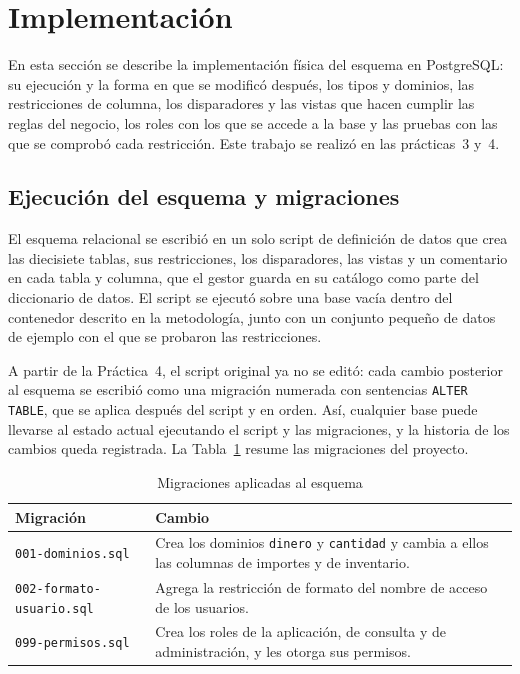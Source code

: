 \newpage

\section{Implementación}
\label{sec:implementacion}

En esta sección se describe la implementación física del esquema en PostgreSQL: su ejecución y la forma en que se modificó después, los tipos y dominios, las restricciones de columna, los disparadores y las vistas que hacen cumplir las reglas del negocio, los roles con los que se accede a la base y las pruebas con las que se comprobó cada restricción. Este trabajo se realizó en las prácticas~3 y~4.

\subsection{Ejecución del esquema y migraciones}

El esquema relacional se escribió en un solo script de definición de datos que crea las diecisiete tablas, sus restricciones, los disparadores, las vistas y un comentario en cada tabla y columna, que el gestor guarda en su catálogo como parte del diccionario de datos. El script se ejecutó sobre una base vacía dentro del contenedor descrito en la metodología, junto con un conjunto pequeño de datos de ejemplo con el que se probaron las restricciones.

A partir de la Práctica~4, el script original ya no se editó: cada cambio posterior al esquema se escribió como una migración numerada con sentencias \texttt{ALTER TABLE}, que se aplica después del script y en orden. Así, cualquier base puede llevarse al estado actual ejecutando el script y las migraciones, y la historia de los cambios queda registrada. La Tabla~\ref{tab:migraciones} resume las migraciones del proyecto.

\begin{table}[H]
    \centering
    \small
    \begin{tabularx}{\textwidth}
        {
            >{\RaggedRight\arraybackslash}p{4.4cm}
            >{\RaggedRight\arraybackslash}X
        }
        \toprule
        \textbf{Migración} & \textbf{Cambio} \\
        \midrule
        \texttt{001-dominios.sql} & Crea los dominios \texttt{dinero} y \texttt{cantidad} y cambia a ellos las columnas de importes y de inventario. \\
        \texttt{002-formato-usuario.sql} & Agrega la restricción de formato del nombre de acceso de los usuarios. \\
        \texttt{099-permisos.sql} & Crea los roles de la aplicación, de consulta y de administración, y les otorga sus permisos. \\
        \bottomrule
    \end{tabularx}
    \captionsetup{labelfont=bf, textfont=it, labelsep=newline, justification=raggedright, singlelinecheck=false}
    \caption{Migraciones aplicadas al esquema}
    \label{tab:migraciones}
\end{table}

